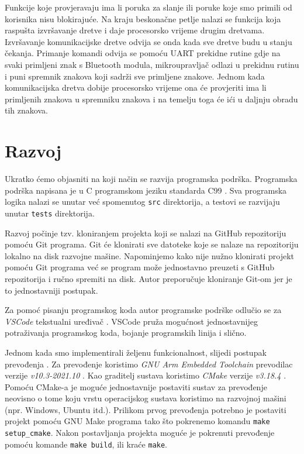 \documentclass[times, utf8, diplomski, numeric]{templates/template}
\begin{document}
{{{{                Funkcije koje provjeravaju ima li poruka za slanje ili poruke koje smo primili od korisnika nisu blokirajuće. Na kraju beskonačne petlje nalazi se funkcija koja raspušta izvršavanje dretve i daje procesorsko vrijeme drugim dretvama. Izvršavanje komunikacijske dretve odvija se onda kada sve dretve budu u stanju čekanja. Primanje komandi odvija se pomoću UART prekidne rutine gdje na svaki primljeni znak s Bluetooth modula, mikroupravljač odlazi u prekidnu rutinu i puni spremnik znakova koji sadrži sve primljene znakove. Jednom kada komunikacijska dretva dobije procesorsko vrijeme ona će provjeriti ima li primljenih znakova u spremniku znakova i na temelju toga će ići u daljnju obradu tih znakova. 
            }
        }
    }

    \section{Razvoj}{
        Ukratko ćemo objasniti na koji način se razvija programska podrška. Programska podrška napisana je u C programskom jeziku standarda C99 \cite{c99}. Sva programska logika nalazi se unutar već spomenutog \texttt{src} direktorija, a testovi se razvijaju unutar \texttt{tests} direktorija. 
        
        Razvoj počinje tzv. kloniranjem projekta koji se nalazi na GitHub repozitoriju \cite{github_repo} pomoću Git programa. Git će klonirati sve datoteke koje se nalaze na repozitoriju lokalno na disk razvojne mašine. Napominjemo kako nije nužno klonirati projekt pomoću Git programa već se program može jednostavno preuzeti s GitHub repozitorija i ručno spremiti na disk. Autor preporučuje kloniranje Git-om jer je to jednostavniji postupak.  

        Za pomoć pisanju programskog koda autor programske podrške odlučio se za \emph{VSCode} tekstualni uređivač \cite{vscode}. VSCode pruža mogućnost jednostavnijeg potraživanja programskog koda, bojanje programskih linija i slično.
        
        Jednom kada smo implementirali željenu funkcionalnost, slijedi postupak prevođenja . Za prevođenje koristimo \emph{GNU Arm Embedded Toolchain} prevodilac  verzije \emph{v10.3-2021.10} \cite{gnu_arm_toolchain}. Kao graditelj sustava  koristimo \emph{CMake} verzije \emph{v3.18.4} \cite{cmake}. Pomoću CMake-a je moguće jednostavnije postaviti sustav za prevođenje neovisno o tome koju vrstu operacijskog sustava koristimo na razvojnoj mašini (npr. Windows, Ubuntu itd.). Prilikom prvog prevođenja potrebno je postaviti projekt pomoću GNU Make programa tako što pokrenemo komandu \texttt{make setup\_cmake}. Nakon postavljanja projekta moguće je pokrenuti prevođenje pomoću komande \texttt{make build}, ili kraće \texttt{make}. 

}}
\end{document}
